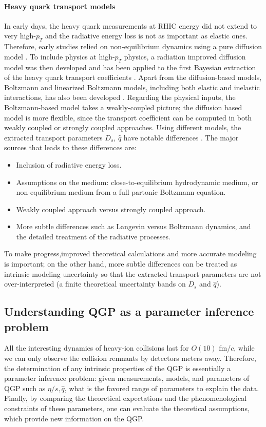 \paragraph{Heavy quark transport models}
In early days, the heavy quark measurements at RHIC energy did not extend to very high-$p_T$ and the radiative energy loss is not as important as elastic ones.
Therefore, early studies relied on non-equilibrium dynamics using a pure diffusion model \cite{Moore:2004tg,vanHees:2007me}. 
To include physics at high-$p_T$ physics, a radiation improved diffusion model was then developed \cite{Cao:2013ita} and has been applied to the first Bayesian extraction of the heavy quark transport coefficients \cite{Xu:2017obm}.
Apart from the diffusion-based models, Boltzmann and linearized Boltzmann models, including both elastic and inelastic interactions, has also been developed \cite{Scardina:2017ipo,Cao:2017hhk,Ke:2018tsh}.
Regarding the physical inputs, the Boltzmann-based model takes a weakly-coupled picture; the diffusion based model is more flexible, since the transport coefficient can be computed in both weakly coupled or strongly coupled approaches.
Using different models, the extracted transport parameters $D_s$, $\hat{q}$ have notable differences \cite{Rapp:2018qla,PhysRevC.99.014902,Cao:2018ews}.
The major sources that leads to these differences are:
\begin{itemize}
\item Inclusion of radiative energy loss.
\item Assumptions on the medium: close-to-equilibrium hydrodynamic medium, or non-equilibrium medium from a full partonic Boltzmann equation.
\item Weakly coupled approach versus strongly coupled approach.
\item More subtle differences such as Langevin versus Boltzmann dynamics, and the detailed treatment of the radiative processes.
\end{itemize}
To make progress,improved theoretical calculations and more accurate modeling is important; on the other hand, more subtle differences can be treated as intrinsic modeling uncertainty so that the extracted transport parameters are not over-interpreted (a finite theoretical uncertainty bands on $D_s$ and $\hat{q}$). 

\subsection{Understanding QGP as a parameter inference problem}
All the interesting dynamics of heavy-ion collisions last for $O(10) $ fm/$c$, while we can only observe the collision remnants by detectors meters away.
Therefore, the determination of any intrinsic properties of the QGP is essentially  a parameter inference problem:
given measurements, models, and parameters of QGP such as $\eta/s, \hat{q}$, what is the favored range of parameters to explain the data.
Finally, by comparing the theoretical expectations and the phenomenological constraints of these parameters, one can evaluate the theoretical assumptions, which provide new information on the QGP.

